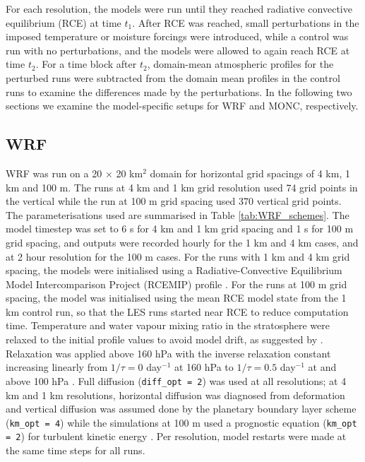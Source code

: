 \documentclass[draft]{agujournal2019}
\begin{document}
For each resolution, the models were run until they reached radiative convective
equilibrium (RCE) at time $t_1$. After RCE was reached, small perturbations in
the imposed temperature or moisture forcings were introduced, while a control
was run with no perturbations, and the models were allowed to again reach RCE at
time $t_2$. For a time block after $t_2$, domain-mean atmospheric profiles for
the perturbed runs were subtracted from the domain mean profiles in the control
runs to examine the differences made by the perturbations. In the following two
sections we examine the model-specific setups for WRF and MONC, respectively.

\subsection{WRF}

WRF was run on a 20 $\times$ 20 km$^2$ domain for horizontal grid spacings of 4
km, 1 km and 100 m. The runs at 4 km and 1 km grid resolution used 74 grid
points in the vertical while the run at 100 m grid spacing used 370 vertical
grid points. The parameterisations used are summarised in Table
\ref{tab:WRF_schemes}. The model timestep was set to 6 s for 4 km and 1 km grid
spacing and 1 s for 100 m grid spacing, and outputs were recorded hourly for the
1 km and 4 km cases, and at 2 hour resolution for the 100 m cases. For the runs
with 1 km and 4 km grid spacing, the models were initialised using a
Radiative-Convective Equilibrium Model Intercomparison Project (RCEMIP) profile
\cite{Wing_GMD_2018}. For the runs at 100 m grid spacing, the model was
initialised using the mean RCE model state from the 1 km control run, so that
the LES runs started near RCE to reduce computation time. Temperature and water
vapour mixing ratio in the stratosphere were relaxed to the initial profile
values to avoid model drift, as suggested by .
Relaxation was applied above 160 hPa with the inverse relaxation constant
increasing linearly from $1/\tau = 0$ day$^{-1}$ at 160 hPa to $1/\tau = 0.5$
day$^{-1}$ at and above 100 hPa \cite{Herman_JAMES_2013}. Full diffusion
(\texttt{diff\_opt = 2}) was used at all resolutions; at 4 km and 1 km
resolutions, horizontal diffusion was diagnosed from deformation and vertical
diffusion was assumed done by the planetary boundary layer scheme
(\texttt{km\_opt = 4}) while the simulations at 100 m used a prognostic equation
(\texttt{km\_opt = 2}) for turbulent kinetic energy \cite{Skamarock_2019}. Per
resolution, model restarts were made at the same time steps for all runs.
\end{document}

